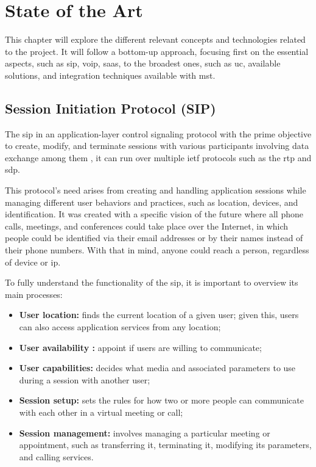 \chapter{State of the Art}

This chapter will explore the different relevant concepts and technologies related to the project. It will follow a bottom-up approach, focusing first on the essential aspects, such as \gls{sip}, \gls{voip}, \gls{saas}, to the broadest ones, such as \gls{uc}, available solutions, and integration techniques available with \gls{mst}.

\section{Session Initiation Protocol (SIP)}

The \gls{sip} in an application-layer control signaling protocol with the prime objective to create, modify, and terminate sessions with various participants involving data exchange among them \citep{rfc3261}, it can run over multiple \gls{ietf} protocols such as the \gls{rtp} and \gls{sdp}.

This protocol's need arises from creating and handling application sessions while managing different user behaviors and practices, such as location, devices, and identification. It was created with a specific vision of the future where all phone calls, meetings, and conferences could take place over the Internet, in which people could be identified via their email addresses or by their names instead of their phone numbers. With that in mind, anyone could reach a person, regardless of device or \gls{ip}.

To fully understand the functionality of the \gls{sip}, it is important to overview its main processes:

\begin{itemize}

   \item \textbf{User location:} finds the current location of a given user; given this, users can also access application services from any location;

   \item \textbf{User availability :} appoint if users are willing to communicate;

   \item \textbf{User capabilities:} decides what media and associated parameters to use during a session with another user;

   \item \textbf{Session setup:} sets the rules for how two or more people can communicate with each other in a virtual meeting or call;

   \item \textbf{Session management:} involves managing a particular meeting or appointment, such as transferring it, terminating it, modifying its parameters, and calling services.
   
\end{itemize}

